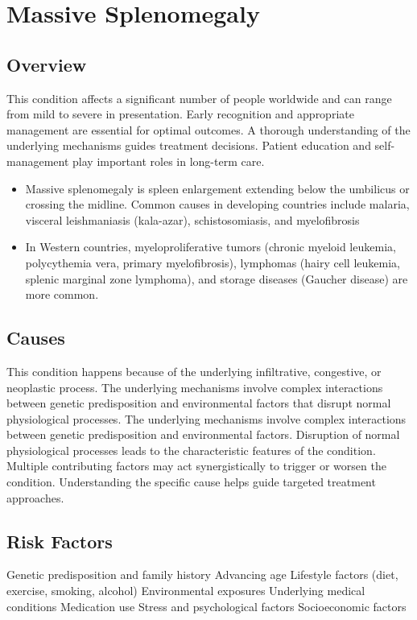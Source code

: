 \chapter{Massive Splenomegaly}
\label{sec:Massive Splenomegaly}

\section{Overview}
This condition affects a significant number of people worldwide and can range from mild to severe in presentation. Early recognition and appropriate management are essential for optimal outcomes. A thorough understanding of the underlying mechanisms guides treatment decisions. Patient education and self-management play important roles in long-term care.

\begin{itemize}[noitemsep]
  \item Massive splenomegaly is spleen enlargement extending below the umbilicus or crossing the midline. Common causes in developing countries include malaria, visceral leishmaniasis (kala-azar), schistosomiasis, and myelofibrosis
  \item In Western countries, myeloproliferative tumors (chronic myeloid leukemia, polycythemia vera, primary myelofibrosis), lymphomas (hairy cell leukemia, splenic marginal zone lymphoma), and storage diseases (Gaucher disease) are more common.
\end{itemize}
\section{Causes}
This condition happens because of the underlying infiltrative, congestive, or neoplastic process. The underlying mechanisms involve complex interactions between genetic predisposition and environmental factors that disrupt normal physiological processes. The underlying mechanisms involve complex interactions between genetic predisposition and environmental factors. Disruption of normal physiological processes leads to the characteristic features of the condition. Multiple contributing factors may act synergistically to trigger or worsen the condition. Understanding the specific cause helps guide targeted treatment approaches.
\section{Risk Factors}
Genetic predisposition and family history Advancing age Lifestyle factors (diet, exercise, smoking, alcohol) Environmental exposures Underlying medical conditions Medication use Stress and psychological factors Socioeconomic factors

